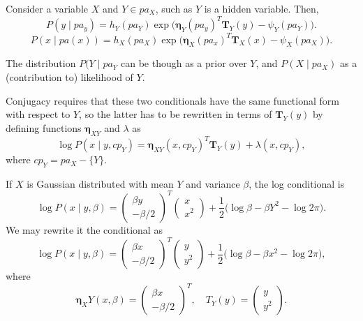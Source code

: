 Consider a variable \( X \) and \( Y \in pa_X \), such as \( Y \) is a hidden variable. Then,
\[
     P(y \mid pa_y) = h_Y(pa_Y)\exp \Big( \bm{\eta}_Y(pa_y)^T\bm{T}_Y(y) - \psi_Y(pa_Y) \Big).
\] 
\[
     P(x \mid pa(x)) = h_X(pa_X)\exp \Big( \bm{\eta}_X(pa_x)^T\bm{T}_X(x) - \psi_X(pa_X) \Big).
\] 

The distribution \( P(Y \mid pa_Y \) can be though as a prior over \( Y \), and \( P(X \mid pa_X) \) as a (contribution to) likelihood of \( Y \).  

Conjugacy requires that these two conditionals have the same functional form with respect to \( Y \), so the latter has to be rewritten in terms of \( \bm{T}_Y (y)\) by defining functions \( \bm{\eta}_{XY} \) and \( \lambda \) as
\[
     \log P(x \mid y , cp_Y) = \bm{\eta}_{XY}(x, cp_Y)^T \bm{T}_Y(y) + \lambda(x, cp_Y),
\]  
where \( cp_Y = pa_X - \{Y\} \).

\begin{exampleth}
    If \( X \) is Gaussian distributed with mean \( Y \) and variance \( \beta \), the log conditional is 
    \[
         \log P(x \mid y, \beta) = 
         \begin{pmatrix}
             \beta y\\
             -\beta/2
         \end{pmatrix}^T
         \begin{pmatrix}
             x\\
             x^2
         \end{pmatrix}
         + \frac{1}{2}\big( \log \beta - \beta Y^2 - \log 2\pi \big).
    \] 
    We may rewrite it the conditional as
    \[
         \log  P(x \mid y, \beta) = 
         \begin{pmatrix}
             \beta x\\
             -\beta/2
         \end{pmatrix}^T
         \begin{pmatrix}
             y\\
             y^2
         \end{pmatrix}
         + \frac{1}{2}\big( \log \beta - \beta x^2 - \log 2\pi \big),
    \]
    where
    \[
         \bm{\eta}_XY(x,\beta) =  \begin{pmatrix}
            \beta x\\
            -\beta/2
        \end{pmatrix}^T,\quad T_Y(y)=  \begin{pmatrix}
            y\\
            y^2
        \end{pmatrix}.
    \]
\end{exampleth}

